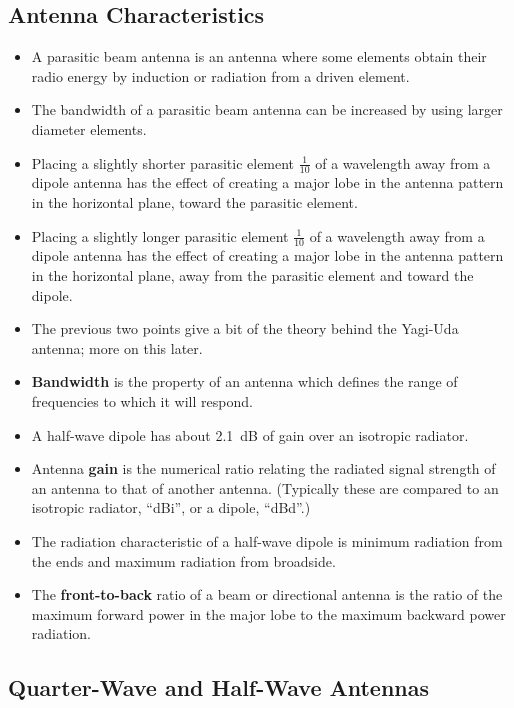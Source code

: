\documentclass[letterpaper,12pt]{scrartcl}
\begin{document}
\subsection{Antenna Characteristics}

\begin{itemize}
\item A parasitic beam antenna is an antenna where some elements obtain their radio energy by induction or radiation from a driven element.
\item The bandwidth of a parasitic beam antenna can be increased by using larger diameter elements.
\item Placing a slightly shorter parasitic element $\frac{1}{10}$ of a wavelength away from a dipole antenna has the effect of creating a major lobe
in the antenna pattern in the horizontal plane, toward the parasitic element.
\item Placing a slightly longer parasitic element $\frac{1}{10}$ of a wavelength away from a dipole antenna has the effect of creating a major lobe
in the antenna pattern in the horizontal plane, away from the parasitic element and toward the dipole.
\item The previous two points give a bit of the theory behind the Yagi-Uda antenna; more on this later. 
\item \textbf{Bandwidth} is the property of an antenna which defines the range of frequencies to which it will respond.
\item A half-wave dipole has about 2.1~dB of gain over an isotropic radiator.
\item Antenna \textbf{gain} is the numerical ratio relating the radiated signal strength of an antenna to that of another antenna.
(Typically these are compared to an isotropic radiator, ``dBi'', or a dipole, ``dBd''.)
\item The radiation characteristic of a half-wave dipole is minimum radiation from the ends and maximum radiation from broadside.
\item The \textbf{front-to-back} ratio of a beam or directional antenna is the ratio of the maximum forward power in the major lobe
to the maximum backward power radiation.
\end{itemize}

\subsection{Quarter-Wave and Half-Wave Antennas}
\end{document}
